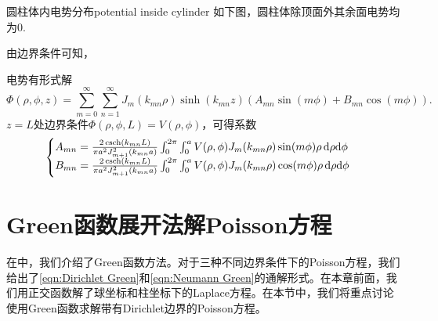 \begin{example}{圆柱体内电势分布}{potential inside cylinder}
    如下图，圆柱体除顶面外其余面电势均为0.
    \begin{center}
    \end{center}
    由边界条件可知，

    电势有形式解
    \[
        \Phi(\rho,\phi,z)=\sum_{m=0}^\infty\sum_{n=1}^\infty J_m(k_{mn}\rho)\sinh(k_{mn}z)(A_{mn}\sin(m\phi)+B_{mn}\cos(m\phi)).
    \]
    $z=L$处边界条件$\Phi(\rho,\phi,L)=V(\rho,\phi)$，可得系数
    \[
        \begin{cases}
            A_{mn}=\frac{2\operatorname{csch}(k_{mn}L)}{\pi a^2J_{m+1}^2(k_{mn}a)}\int_0^{2\pi}\int_0^aV(\rho,\phi)J_m(k_{mn}\rho)\sin(m\phi)\rho\mathop{}\!\mathrm{d}\rho\mathrm{d}\phi\\
            B_{mn}=\frac{2\operatorname{csch}(k_{mn}L)}{\pi a^2J_{m+1}^2(k_{mn}a)}\int_0^{2\pi}\int_0^aV(\rho,\phi)J_m(k_{mn}\rho)\cos(m\phi)\rho\mathop{}\!\mathrm{d}\rho\mathrm{d}\phi
        \end{cases}
    \]
\end{example}

\section{Green函数展开法解Poisson方程}
\label{sec:Green expansion solve Poisson}

在中，我们介绍了Green函数方法。对于三种不同边界条件下的Poisson方程，我们给出了\eqref{eqn:Dirichlet Green}和\eqref{eqn:Neumann Green}的通解形式。在本章前面，我们用正交函数解了球坐标和柱坐标下的Laplace方程。在本节中，我们将重点讨论使用Green函数求解带有Dirichlet边界的Poisson方程。

